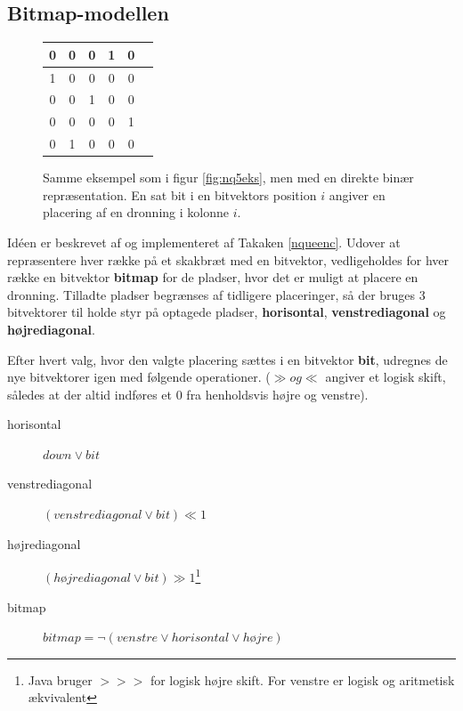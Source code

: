\documentclass[final,a4paper,11pt]{article}
\begin{document}

\subsection{Bitmap-modellen}\label{bitmapmodellen}

\begin{figure}[!h]
\begin{center}
\begin{tabular}{|c|c|c|c|c|c}
\hline	0 & 0 & 0 & 1 & 0 \\
\hline	1 & 0 & 0 & 0 & 0 \\
\hline	0 & 0 & 1 & 0 & 0 \\
\hline	0 & 0 & 0 & 0 & 1 \\
\hline	0 & 1 & 0 & 0 & 0 \\
\hline
\end{tabular}
\end{center}
\caption{Samme eksempel som i figur \ref{fig:nq5eks}, men med en direkte binær repræsentation. En sat bit i en bitvektors position $i$ angiver en placering af en dronning i kolonne $i$.}
\label{fig:nq5eksbitmap}
\end{figure}

Idéen er beskrevet af \cite{Zongyan02} og implementeret af Takaken \ref{nqueenc}. Udover at repræsentere hver række på et skakbræt med en bitvektor, vedligeholdes for hver række  en bitvektor \textbf{bitmap} for de pladser, hvor det er muligt at placere en dronning.  Tilladte pladser begrænses af tidligere placeringer, så der bruges 3 bitvektorer til holde styr på optagede pladser, \textbf{horisontal}, \textbf{venstrediagonal}  og \textbf{højrediagonal}.

Efter hvert valg, hvor den valgte placering sættes i en bitvektor \textbf{bit}, udregnes de nye bitvektorer igen med følgende operationer. ($\gg og \ll$ angiver et logisk skift, således at der altid indføres et $0$ fra henholdsvis højre og venstre).
\begin{description}
	\item[horisontal] $down \lor bit$ 
	\item[venstrediagonal] $(venstrediagonal \lor bit) \ll 1$
	\item[højrediagonal] $(højrediagonal \lor bit) \gg  1$\footnote{Java bruger $>>>$ for logisk højre skift. For venstre er logisk og aritmetisk ækvivalent}
	\item[bitmap]	$bitmap = \lnot(venstre \lor horisontal \lor højre)$	
\end{description}
\end{document}
